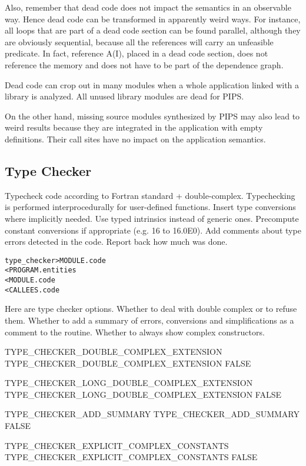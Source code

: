 \documentclass[a4paper]{report}
\newenvironment{PipsMake}{\begin{alltt}}{\end{alltt}}
\begin{document}
Also, remember that dead code does not impact the semantics in an
observable way. Hence dead code can be transformed in apparently weird
ways. For instance, all loops that are part of a dead code section can
be found parallel, although they are obviously sequential, because all
the references will carry an unfeasible predicate. In fact, reference
A(I), placed in a dead code section, does not reference the memory and
does not have to be part of the dependence graph.

Dead code can crop out in many modules when a whole application linked
with a library is analyzed. All unused library modules are dead for
PIPS.

On the other hand, missing source modules synthesized by PIPS may also
lead to weird results because they are integrated in the application
with empty definitions. Their call sites have no impact on the
application semantics.


\subsection{Type Checker}
\label{subsection-type-checker}

Typecheck code according to Fortran standard + double-complex.
Typechecking is performed interprocedurally for user-defined functions.
Insert type conversions where implicitly needed.
Use typed intrinsics instead of generic ones.
Precompute constant conversions if appropriate (e.g. 16 to 16.0E0).
Add comments about type errors detected in the code.
Report back how much was done.

\begin{PipsMake}
type_checker            > MODULE.code
        < PROGRAM.entities
        < MODULE.code
        < CALLEES.code
\end{PipsMake}

Here are type checker options. Whether to deal with double complex or to
refuse them. Whether to add a summary of errors, conversions and
simplifications as a comment to the routine. Whether to always show complex
constructors.

\begin{PipsProp}{TYPE_CHECKER_DOUBLE_COMPLEX_EXTENSION}
TYPE_CHECKER_DOUBLE_COMPLEX_EXTENSION FALSE
\end{PipsProp}
\begin{PipsProp}{TYPE_CHECKER_LONG_DOUBLE_COMPLEX_EXTENSION}
TYPE_CHECKER_LONG_DOUBLE_COMPLEX_EXTENSION FALSE
\end{PipsProp}
\begin{PipsProp}{TYPE_CHECKER_ADD_SUMMARY}
TYPE_CHECKER_ADD_SUMMARY FALSE
\end{PipsProp}
\begin{PipsProp}{TYPE_CHECKER_EXPLICIT_COMPLEX_CONSTANTS}
TYPE_CHECKER_EXPLICIT_COMPLEX_CONSTANTS FALSE
\end{PipsProp}
\end{document}
